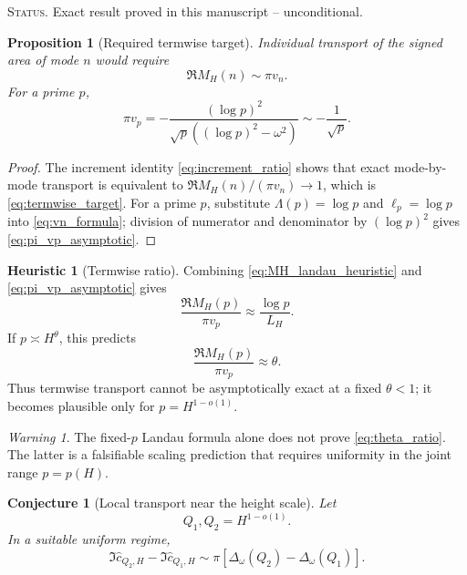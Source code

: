 \documentclass[11pt]{amsart}
\numberwithin{equation}{section}
\theoremstyle{plain}
\newtheorem{proposition}[theorem]{Proposition}
\newtheorem{conjecture}[theorem]{Conjecture}
\theoremstyle{definition}
\newtheorem{heuristic}[theorem]{Heuristic}
\theoremstyle{remark}
\newtheorem{warning}[theorem]{Warning}
\newcommand{\1}{\mathbf{1}}
\newcommand{\statusnote}[1]{%
  \par\smallskip\noindent
  \begingroup\footnotesize\textsc{Status.} #1\endgroup
  \par\smallskip}
\begin{document}
\statusnote{Exact result proved in this manuscript -- unconditional.}
\begin{proposition}[Required termwise target]
\label{prop:termwise_target}
Individual transport of the signed area of mode \(n\) would require
\begin{equation}
\Re M_H(n)\sim\pi v_n.
\label{eq:termwise_target}
\end{equation}
For a prime \(p\),
\begin{equation}
\pi v_p
=
-\frac{(\log p)^2}
{\sqrt p((\log p)^2-\omega^2)}
\sim
-\frac1{\sqrt p}.
\label{eq:pi_vp_asymptotic}
\end{equation}
\end{proposition}

\begin{proof}
The increment identity \eqref{eq:increment_ratio} shows that exact
mode-by-mode transport is equivalent to
\(\Re M_H(n)/(\pi v_n)\to1\), which is
\eqref{eq:termwise_target}.  For a prime \(p\), substitute
\(\Lambda(p)=\log p\) and \(\ell_p=\log p\) into
\eqref{eq:vn_formula}; division of numerator and denominator by
\((\log p)^2\) gives \eqref{eq:pi_vp_asymptotic}.
\end{proof}

\begin{heuristic}[Termwise ratio]
\label{heur:termwise_ratio}
Combining \eqref{eq:MH_landau_heuristic} and
\eqref{eq:pi_vp_asymptotic} gives
\begin{equation}
\frac{\Re M_H(p)}{\pi v_p}
\approx
\frac{\log p}{L_H}.
\label{eq:termwise_ratio}
\end{equation}
If \(p\asymp H^\theta\), this predicts
\begin{equation}
\frac{\Re M_H(p)}{\pi v_p}
\approx\theta.
\label{eq:theta_ratio}
\end{equation}
Thus termwise transport cannot be asymptotically exact at a fixed
\(\theta<1\); it becomes plausible only for
\(p=H^{1-o(1)}\).
\end{heuristic}

\begin{warning}
\label{warn:uniform_landau}
The fixed-\(p\) Landau formula alone does not prove
\eqref{eq:theta_ratio}.  The latter is a falsifiable scaling prediction
that requires uniformity in the joint range \(p=p(H)\).
\end{warning}

\begin{conjecture}[Local transport near the height scale]
\label{conj:local_transport}
Let
\begin{equation}
Q_1,Q_2=H^{1-o(1)}.
\label{eq:local_Q_range}
\end{equation}
In a suitable uniform regime,
\begin{equation}
\Im\widehat c_{Q_2,H}-\Im\widehat c_{Q_1,H}
\sim
\pi\left[
\Delta_\omega(Q_2)-\Delta_\omega(Q_1)
\right].
\label{eq:local_transport_conjecture}
\end{equation}
\end{conjecture}
\end{document}
